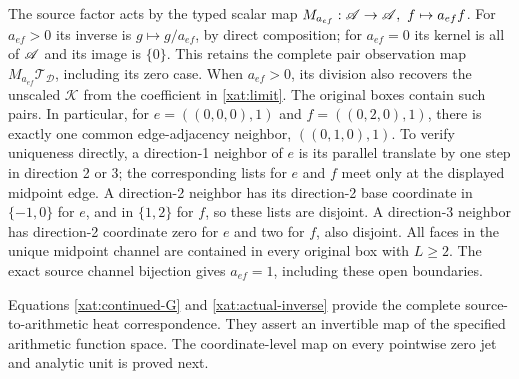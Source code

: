 The source factor acts by the typed scalar map
\(M_{a_{ef}}:\mathscr A\to\mathscr A,\ f\mapsto a_{ef}f\).
For \(a_{ef}>0\) its inverse is \(g\mapsto g/a_{ef}\), by direct
composition; for \(a_{ef}=0\) its kernel is all of \(\mathscr A\) and its
image is \(\{0\}\). This retains the complete pair observation map
\(M_{a_{ef}}\mathcal T_{\mathcal D}\), including its zero case.
When \(a_{ef}>0\), its division also recovers the unscaled
\(\mathcal K\) from the coefficient in
\eqref{xat:limit}. The original boxes contain such pairs. In
particular, for \(e=((0,0,0),1)\) and
\(f=((0,2,0),1)\), there is exactly one common edge-adjacency
neighbor, \(((0,1,0),1)\). To verify uniqueness directly, a
direction-1 neighbor of \(e\) is its parallel translate by one
step in direction 2 or 3; the corresponding lists for \(e\)
and \(f\) meet only at the displayed midpoint edge. A
direction-2 neighbor has its direction-2 base coordinate in
\(\{-1,0\}\) for \(e\), and in \(\{1,2\}\) for \(f\),
so these lists are disjoint. A direction-3 neighbor has
direction-2 coordinate zero for \(e\) and two for \(f\), also
disjoint. All faces in the unique midpoint channel are contained
in every original box with \(L\geq2\). The exact source
channel bijection gives \(a_{ef}=1\), including these open
boundaries.

Equations \eqref{xat:continued-G} and \eqref{xat:actual-inverse}
provide the complete source-to-arithmetic heat correspondence.
They assert an invertible map of the specified arithmetic function space.
The coordinate-level map on every pointwise zero jet and analytic unit
is proved next.

